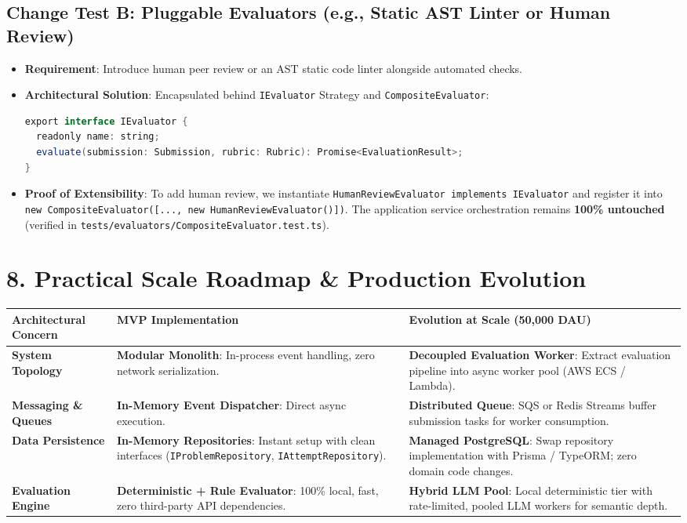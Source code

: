 \documentclass[10pt,a4paper]{article}
\begin{document}
\subsection{Change Test B: Pluggable Evaluators (e.g., Static AST Linter or Human Review)}
\begin{itemize}
  \item \textbf{Requirement}: Introduce human peer review or an AST static code linter alongside automated checks.
  \item \textbf{Architectural Solution}: Encapsulated behind \texttt{IEvaluator} Strategy and \texttt{CompositeEvaluator}:
\begin{lstlisting}[language=java]
export interface IEvaluator {
  readonly name: string;
  evaluate(submission: Submission, rubric: Rubric): Promise<EvaluationResult>;
}
\end{lstlisting}
  \item \textbf{Proof of Extensibility}: To add human review, we instantiate \texttt{HumanReviewEvaluator implements IEvaluator} and register it into \texttt{new CompositeEvaluator([..., new HumanReviewEvaluator()])}. The application service orchestration remains \textbf{100\% untouched} (verified in \texttt{tests/evaluators/CompositeEvaluator.test.ts}).
\end{itemize}

\section{8. Practical Scale Roadmap \& Production Evolution}

\begin{table}[h!]
\small
\centering
\begin{tabularx}{\textwidth}{l p{5.5cm} X}
\toprule
\textbf{Architectural Concern} & \textbf{MVP Implementation} & \textbf{Evolution at Scale (50,000 DAU)} \\
\midrule
\textbf{System Topology} & \textbf{Modular Monolith}: In-process event handling, zero network serialization. & \textbf{Decoupled Evaluation Worker}: Extract evaluation pipeline into async worker pool (AWS ECS / Lambda). \\
\addlinespace[3pt]
\textbf{Messaging \& Queues} & \textbf{In-Memory Event Dispatcher}: Direct async execution. & \textbf{Distributed Queue}: SQS or Redis Streams buffer submission tasks for worker consumption. \\
\addlinespace[3pt]
\textbf{Data Persistence} & \textbf{In-Memory Repositories}: Instant setup with clean interfaces (\texttt{IProblemRepository}, \texttt{IAttemptRepository}). & \textbf{Managed PostgreSQL}: Swap repository implementation with Prisma / TypeORM; zero domain code changes. \\
\addlinespace[3pt]
\textbf{Evaluation Engine} & \textbf{Deterministic + Rule Evaluator}: 100\% local, fast, zero third-party API dependencies. & \textbf{Hybrid LLM Pool}: Local deterministic tier with rate-limited, pooled LLM workers for semantic depth. \\
\bottomrule
\end{tabularx}
\end{table}
\end{document}
